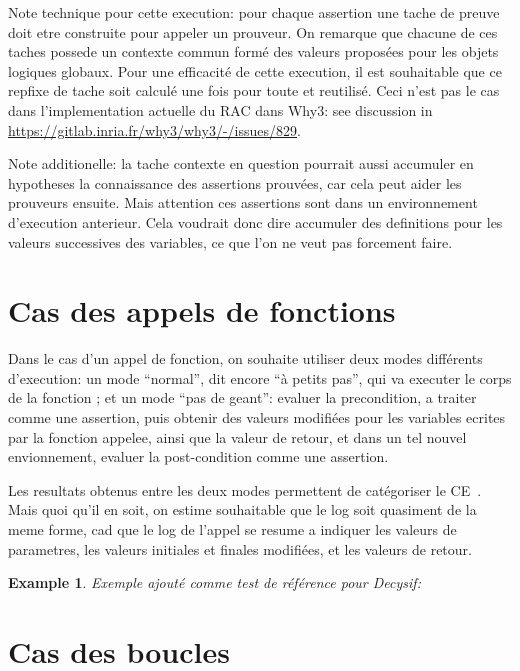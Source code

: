 \documentclass[a4paper,twoside]{article}
\newtheorem{example}[definition]{Example}
\begin{document}
Note technique pour cette execution: pour chaque assertion une tache de preuve
doit etre construite pour appeler un prouveur. On remarque que chacune de ces
taches possede un contexte commun formé des valeurs proposées pour les objets
logiques globaux. Pour une efficacité de cette execution, il est souhaitable que
ce repfixe de tache soit calculé une fois pour toute et reutilisé. Ceci n'est
pas le cas dans l'implementation actuelle du RAC dans Why3: see discussion in
\url{https://gitlab.inria.fr/why3/why3/-/issues/829}.

Note additionelle: la tache contexte en question pourrait aussi accumuler en
hypotheses la connaissance des assertions prouvées, car cela peut aider les
prouveurs ensuite. Mais attention ces assertions sont dans un environnement
d'execution anterieur. Cela voudrait donc dire accumuler des definitions pour
les valeurs successives des variables, ce que l'on ne veut pas forcement faire.




\section{Cas des appels de fonctions}


Dans le cas d'un appel de fonction, on souhaite utiliser deux modes différents
d'execution: un mode ``normal'', dit encore ``à petits pas'', qui va executer le
corps de la fonction ; et un mode ``pas de geant'': evaluer la precondition, a
traiter comme une assertion, puis obtenir des valeurs modifiées pour les
variables ecrites par la fonction appelee, ainsi que la valeur de retour, et
dans un tel nouvel envionnement, evaluer la post-condition comme une assertion.

Les resultats obtenus entre les deux modes permettent de catégoriser le
CE~\cite{becker21rr}. Mais quoi qu'il en soit, on estime souhaitable que le log
soit quasiment de la meme forme, cad que le log de l'appel se resume a indiquer
les valeurs de parametres, les valeurs initiales et finales modifiées, et les
valeurs de retour.


\begin{example}
Exemple ajouté comme test de référence pour Decysif:


\end{example}


\section{Cas des boucles}
\end{document}

